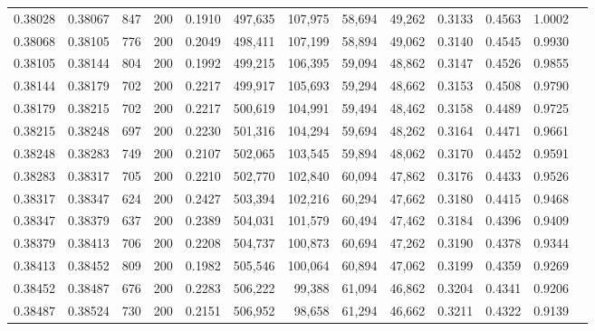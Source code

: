 \begin{tabular}{rrrrrrrrrrrrr}
0.38028 & 0.38067 &   847 & 200 &                                     0.1910 & 497,635 & 107,975 &  58,694 &  49,262 & 0.3133 & 0.4563 & 1.0002 \\
0.38068 & 0.38105 &   776 & 200 &                                     0.2049 & 498,411 & 107,199 &  58,894 &  49,062 & 0.3140 & 0.4545 & 0.9930 \\
0.38105 & 0.38144 &   804 & 200 &                                     0.1992 & 499,215 & 106,395 &  59,094 &  48,862 & 0.3147 & 0.4526 & 0.9855 \\
0.38144 & 0.38179 &   702 & 200 &                                     0.2217 & 499,917 & 105,693 &  59,294 &  48,662 & 0.3153 & 0.4508 & 0.9790 \\
0.38179 & 0.38215 &   702 & 200 &                                     0.2217 & 500,619 & 104,991 &  59,494 &  48,462 & 0.3158 & 0.4489 & 0.9725 \\
0.38215 & 0.38248 &   697 & 200 &                                     0.2230 & 501,316 & 104,294 &  59,694 &  48,262 & 0.3164 & 0.4471 & 0.9661 \\
0.38248 & 0.38283 &   749 & 200 &                                     0.2107 & 502,065 & 103,545 &  59,894 &  48,062 & 0.3170 & 0.4452 & 0.9591 \\
0.38283 & 0.38317 &   705 & 200 &                                     0.2210 & 502,770 & 102,840 &  60,094 &  47,862 & 0.3176 & 0.4433 & 0.9526 \\
0.38317 & 0.38347 &   624 & 200 &                                     0.2427 & 503,394 & 102,216 &  60,294 &  47,662 & 0.3180 & 0.4415 & 0.9468 \\
0.38347 & 0.38379 &   637 & 200 &                                     0.2389 & 504,031 & 101,579 &  60,494 &  47,462 & 0.3184 & 0.4396 & 0.9409 \\
0.38379 & 0.38413 &   706 & 200 &                                     0.2208 & 504,737 & 100,873 &  60,694 &  47,262 & 0.3190 & 0.4378 & 0.9344 \\
0.38413 & 0.38452 &   809 & 200 &                                     0.1982 & 505,546 & 100,064 &  60,894 &  47,062 & 0.3199 & 0.4359 & 0.9269 \\
0.38452 & 0.38487 &   676 & 200 &                                     0.2283 & 506,222 &  99,388 &  61,094 &  46,862 & 0.3204 & 0.4341 & 0.9206 \\
0.38487 & 0.38524 &   730 & 200 &                                     0.2151 & 506,952 &  98,658 &  61,294 &  46,662 & 0.3211 & 0.4322 & 0.9139 \\

\end{tabular}
